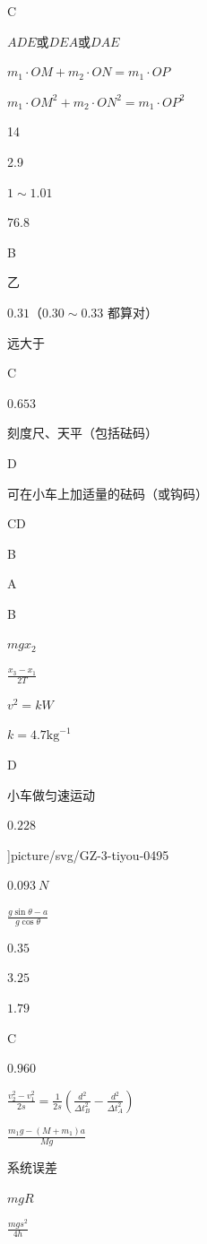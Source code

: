 \item C
\item $ ADE $或$ DEA $或$ DAE $
\item $m_{1} \cdot O M+m_{2} \cdot O N=m_{1} \cdot O P$
\item $m_{1} \cdot O M^{2}+m_{2} \cdot O N^{2}=m_{1} \cdot O P^{2}$
\item 14
\item 2.9
\item $1 \sim 1.01$
\item $ 76.8 $
\item B
\item 乙
\item $ 0.31 $（$ 0.30 \sim 0.33 $ 都算对）
\item 远大于
\item C
\item $ 0.653 $
\item 刻度尺、天平（包括砝码）
\item D
\item 可在小车上加适量的砝码（或钩码）
\item CD
\item B
\item A
\item B
\item $ mgx_{2} $
\item $\frac {x_{3}-x_{1}}{2 T}$
\item $v^{2}=k W$
\item $k=4.7 \mathrm {kg}^{-1}$
\item D
\item 小车做匀速运动
\item $ 0.228 $
\item \linewidth ]{picture/svg/GZ-3-tiyou-0495}
\item $ 0.093 \ N $
\item $\frac {g \sin \theta -a}{g \cos \theta }$
\item $ 0.35 $
\item $ 3.25 $
\item $ 1.79 $
\item C
\item $ 0.960 $
\item $\frac {v_{2}^{2}-v_{1}^{2}}{2 s}=\frac {1}{2 s}\left (\frac {d^{2}}{\Delta t_{B}^{2}}-\frac {d^{2}}{\Delta t_{A}^{2}}\right )$
\item $\frac {m_{1} g-\left (M+m_{1}\right ) a}{M g}$
\item 系统误差
\item $ mgR $
\item $\frac {m g s^{2}}{4 h}$
